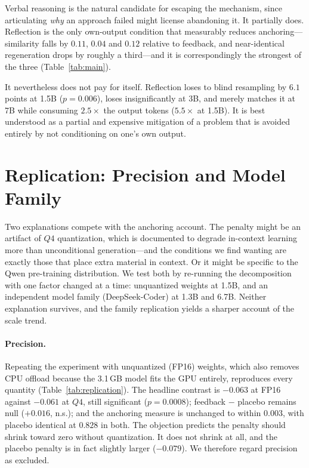 Verbal reasoning \cite{shinn2023reflexion} is the natural candidate for
escaping the mechanism, since articulating \emph{why} an approach failed might
license abandoning it. It partially does. Reflection is the only own-output
condition that measurably reduces anchoring---similarity falls by $0.11$,
$0.04$ and $0.12$ relative to feedback, and near-identical regeneration drops
by roughly a third---and it is correspondingly the strongest of the three
(Table~\ref{tab:main}).

It nevertheless does not pay for itself. Reflection loses to blind resampling
by $6.1$ points at 1.5B ($p{=}0.006$), loses insignificantly at 3B, and merely
matches it at 7B while consuming $2.5\times$ the output tokens ($5.5\times$ at
1.5B). It is best understood as a partial and expensive mitigation of a problem
that is avoided entirely by not conditioning on one's own output.

\section{Replication: Precision and Model Family}
\label{sec:replication}

Two explanations compete with the anchoring account. The penalty might be an
artifact of $Q4$ quantization, which is documented to degrade in-context
learning more than unconditional generation---and the conditions we find
wanting are exactly those that place extra material in context. Or it might be
specific to the Qwen pre-training distribution. We test both by re-running the
decomposition with one factor changed at a time: unquantized weights at 1.5B,
and an independent model family (DeepSeek-Coder) at 1.3B and 6.7B. Neither
explanation survives, and the family replication yields a sharper account of
the scale trend.

\paragraph{Precision.}
Repeating the experiment with unquantized (FP16) weights, which also removes
CPU offload because the 3.1\,GB model fits the GPU entirely, reproduces every
quantity (Table~\ref{tab:replication}). The headline contrast is
$-0.063$ at FP16 against $-0.061$ at $Q4$, still significant
($p{=}0.0008$); \textsf{feedback} $-$ \textsf{placebo} remains null
($+0.016$, n.s.); and the anchoring measure is unchanged to within $0.003$,
with placebo identical at $0.828$ in both. The objection predicts the penalty
should shrink toward zero without quantization. It does not shrink at all, and
the placebo penalty is in fact slightly larger ($-0.079$). We therefore regard
precision as excluded.

